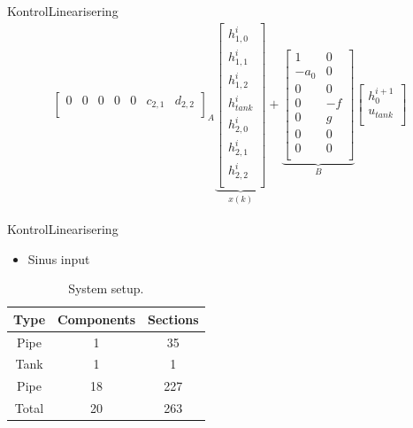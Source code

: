 \begin{frame}{Kontrol}{Linearisering}
\begin{equation}
\begin{aligned}
{\begin{bmatrix}
         0       & 0     &  0    & 0    &0          &c_{2,1}    &  d_{2,2}   \\
        \end{bmatrix}}_{A}
            \underbrace{\begin{bmatrix}
        h_{1,0}^{i} \\
        h_{1,1}^{i} \\
        h_{1,2}^{i} \\
        h_{tank}^{i}\\
        h_{2,0}^{i}\\
        h_{2,1}^{i}\\
          h_{2,2}^{i}\\
        \end{bmatrix}}_{x(k)}
    +  \underbrace{\begin{bmatrix}
         1 & 0\\
         -a_0& 0 \\
         0 & 0\\
          0& -f \\
          0& g \\ 
          0& 0 \\
          0& 0 \\
        \end{bmatrix}}_{B}
        \begin{bmatrix}
        h_0^{i+1}\\
        u_{tank} \\
        \end{bmatrix}
    \end{aligned}
\end{equation}    


\end{frame}

\begin{frame}{Kontrol}{Linearisering}
   \vfill\vfill\centering
    \begin{minipage}[t]{0.48\linewidth}
\begin{itemize}
	   	\item Sinus input
\end{itemize}    
\end{minipage}\hfill
\begin{minipage}[t]{0.48\linewidth}
\begin{table}[H]
\centering
\begin{tabular}{|c|c|c|}
\hline
	\rowcolor[HTML]{9B9B9B} 
Type  & Components & Sections \\ \hline
Pipe  & 1         & 35       \\ \hline
Tank  & 1         & 1        \\ \hline
Pipe  & 18        & 227      \\ \hline
Total & 20        & 263      \\ \hline
\end{tabular}
\caption{System setup.}
\label{tab:system_setup_nonlinear_linear_test}
\end{table}

\end{minipage}
\vfill\vfill

\end{frame}

